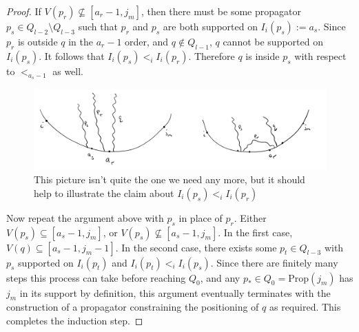 \documentclass[11pt]{article}
\newcommand{\cP}{\mathcal{P}}
\newcommand{\Prop}{\textrm{Prop}}
\theoremstyle{remark}
\theoremstyle{definition}
\begin{document}
\begin{proof}

If $V(p_r) \not \subseteq [a_r-1, j_m]$, then there must be some propagator $p_s \in Q_{l-2}\setminus Q_{l-3}$ such that $p_r$ and $p_s$ are both supported on $I_i(p_s) := a_s$. Since $p_r$ is outside $q$ in the $a_r-1$ order, and $q \not\in Q_{l-1}$, $q$ cannot be supported on $I_i(p_s)$. It follows that $I_i(p_s) <_i I_i(p_r)$. Therefore $q$ is inside $p_s$ with respect to $<_{a_s - 1}$ as well.

\begin{figure}[h]
\includegraphics[scale = 0.3]{awkward_induction_case.jpg}
\caption{This picture isn't quite the one we need any more, but it should help to illustrate the claim about $I_i(p_s) <_i I_i(p_r)$}\label{fig:awkward induction step}
\end{figure}

Now repeat the argument above with $p_s$ in place of $p_r$. Either $V(p_s)  \subseteq [a_s-1, j_m]$, or $V(p_s) \not \subseteq [a_s-1, j_m]$. In the first case, $V(q) \subseteq [a_s-1, j_m-1]$. In the second case, there exists some $p_t \in Q_{l-3}$ with $p_s$ supported on $I_i(p_t)$ and $I_i(p_t) <_i I_i(p_s)$. Since there are finitely many steps this process can take before reaching $Q_0$, and any $p_* \in Q_0  = \Prop(j_m)$ has $j_m$ in its support by definition, this argument eventually terminates with the construction of a propagator constraining the positioning of $q$ as required. This completes the induction step.


\end{proof}
\end{document}
